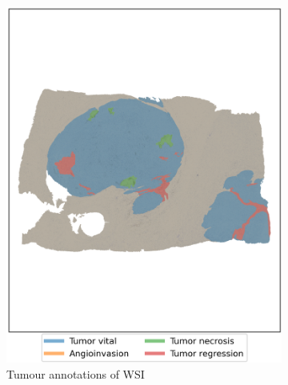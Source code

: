 \begin{figure}[h!t]
    \centering
     \begin{subfigure}[b]{0.475\textwidth}
         \centering
         \includegraphics[width=\textwidth]{latex/captum/case129/masks_case129-stain19-dead_414days.png}
         \caption{Tumour annotations of WSI}
     \end{subfigure}
    \hfill
     \begin{subfigure}[b]{0.49\textwidth}
         \centering

\end{subfigure}
\end{figure}
